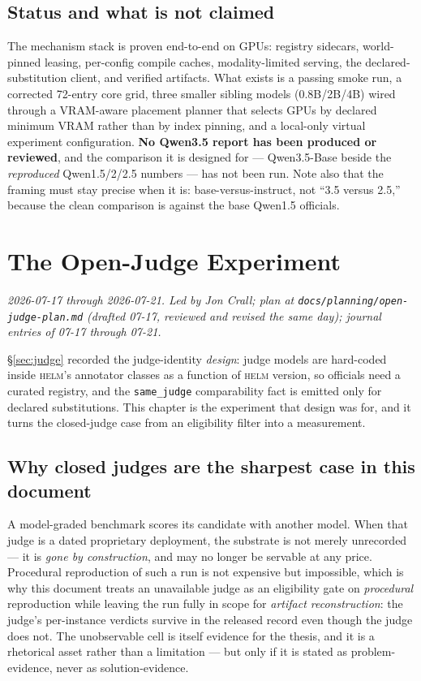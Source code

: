 \documentclass[11pt]{report}
\newcommand{\code}[1]{\texttt{#1}}
\newcommand{\file}[1]{\texttt{#1}}
\begin{document}
\section{Status and what is not claimed}

The mechanism stack is proven end-to-end on GPUs: registry sidecars, world-pinned
leasing, per-config compile caches, modality-limited serving, the declared-
substitution client, and verified artifacts. What exists is a passing smoke run, a
corrected 72-entry core grid, three smaller sibling models
(0.8B/2B/4B) wired through a VRAM-aware placement planner that selects GPUs by
declared minimum VRAM rather than by index pinning, and a local-only virtual
experiment configuration. \textbf{No Qwen3.5 report has been produced or reviewed},
and the comparison it is designed for --- Qwen3.5-Base beside the \emph{reproduced}
Qwen1.5/2/2.5 numbers --- has not been run. Note also that the framing must stay
precise when it is: base-versus-instruct, not ``3.5 versus 2.5,'' because the clean
comparison is against the base Qwen1.5 officials.

\chapter{The Open-Judge Experiment}
\label{chap:openjudge}

\emph{2026-07-17 through 2026-07-21. Led by Jon Crall; plan at
\file{docs/planning/open-judge-plan.md} (drafted 07-17, reviewed and revised the
same day); journal entries of 07-17 through 07-21.}

\S\ref{sec:judge} recorded the judge-identity \emph{design}: judge models are
hard-coded inside \textsc{helm}'s annotator classes as a function of \textsc{helm}
version, so officials need a curated registry, and the \code{same\_judge}
comparability fact is emitted only for declared substitutions. This chapter is the
experiment that design was for, and it turns the closed-judge case from an
eligibility filter into a measurement.

\section{Why closed judges are the sharpest case in this document}

A model-graded benchmark scores its candidate with another model. When that judge is
a dated proprietary deployment, the substrate is not merely unrecorded --- it is
\emph{gone by construction}, and may no longer be servable at any price. Procedural
reproduction of such a run is not expensive but impossible, which is why this
document treats an unavailable judge as an eligibility gate on \emph{procedural}
reproduction while leaving the run fully in scope for \emph{artifact
reconstruction}: the judge's per-instance verdicts survive in the released record
even though the judge does not. The unobservable cell is itself evidence for the
thesis, and it is a rhetorical asset rather than a limitation --- but only if it is
stated as problem-evidence, never as solution-evidence.
\end{document}
